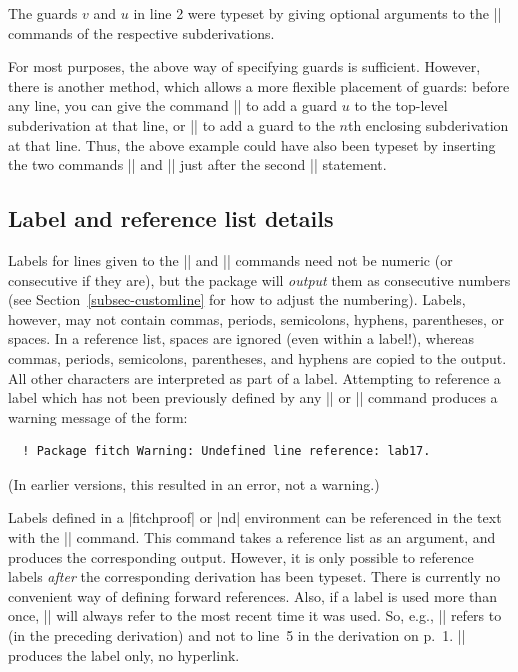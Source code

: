\documentclass{ltxdoc}
\newcommand\NewIn[1]{\leavevmode
  \marginpar{\hfill\fbox{\fbox{New in #1}}\hspace*{1em}}\ignorespaces}
\begin{document}
The guards $v$ and $u$ in line 2 were typeset by giving optional
arguments to the |\open| commands of the respective
subderivations. 

\DescribeMacro{\guard}
For most purposes, the above way of specifying guards is sufficient.
However, there is another method, which allows a more flexible
placement of guards: before any line, you can give the command
|| to add a guard $u$ to the top-level subderivation at
that line, or || to add a guard to the $n$th
enclosing subderivation at that line. Thus, the above example could
have also been typeset by inserting the two commands || and
|| just after the second |\open| statement.


\subsection{Label and reference list details}\label{subsec-ndref}

Labels for lines given to the |\have| and |\hypo| commands need not be
numeric (or consecutive if they are), but the package will
\emph{output} them as consecutive numbers (see
Section~\ref{subsec-customline} for how to adjust the numbering).
Labels, however, may not contain commas, periods, semicolons, hyphens,
parentheses, or spaces. In a reference list, spaces are ignored (even
within a label!), whereas commas, periods, semicolons, parentheses,
and hyphens are copied to the output. All other characters are
interpreted as part of a label. Attempting to reference a label which
has not been previously defined by any |\hypo| or |\have| command
produces a \NewIn{0.6} warning message of the form:
\begin{verbatim}
  ! Package fitch Warning: Undefined line reference: lab17.
\end{verbatim}
(In earlier versions, this resulted in an error, not a warning.)

\DescribeMacro{\ndref} Labels defined in a |fitchproof| or |nd|
environment can be referenced in the text with the |\ndref| command.
This command takes a reference list as an argument, and produces the
corresponding output. However, it is only possible to reference labels
\emph{after} the corresponding derivation has been typeset. There is
currently no convenient way of defining forward references. Also, if a
label is used more than once, |\ndref| will always refer to the most
recent time it was used. So, e.g., || refers to 
(in the preceding derivation) and not to line~5 in the derivation on
p.~1. |\ndref| produces the label only, no hyperlink.
\end{document}
